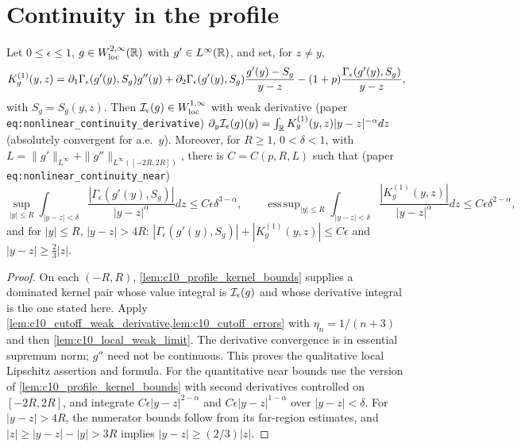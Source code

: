 \section{Continuity in the profile}

\begin{lemma}
  \label{lem:c10_Ieps_local}
  Let $0\le\epsilon\le1$, $g\in W^{2,\infty}_{\mathrm{loc}}(\mathbb{R})$ with $g'\in L^\infty(\mathbb{R})$, and set, for $z\ne y$,
  \[
    K^{(1)}_g(y,z)=\partial_1\Gamma_\epsilon(g'(y),S_g)g''(y)+\partial_2\Gamma_\epsilon(g'(y),S_g)\frac{g'(y)-S_g}{y-z}-(1+p)\frac{\Gamma_\epsilon(g'(y),S_g)}{y-z},
  \]
  with $S_g=S_g(y,z)$. Then $\mathcal{I}_\epsilon(g)\in W^{1,\infty}_{\mathrm{loc}}$ with weak derivative
  (paper \texttt{eq:nonlinear\_continuity\_derivative})
  $\partial_y\mathcal{I}_\epsilon(g)(y)=\int_{\mathbb{R}} K^{(1)}_g(y,z)|y-z|^{-\alpha}dz$ (absolutely convergent for a.e.\ $y$).
  Moreover, for $R\ge1$, $0<\delta<1$, with $L=\|g'\|_{L^\infty}+\|g''\|_{L^\infty([-2R,2R])}$, there is
  $C=C(p,R,L)$ such that (paper \texttt{eq:nonlinear\_continuity\_near})
  \[
    \sup_{|y|\le R}\int_{|y-z|<\delta}\frac{|\Gamma_\epsilon(g'(y),S_g)|}{|y-z|^\alpha}dz\le C\epsilon\delta^{3-\alpha},\qquad
    \mathop{\mathrm{ess\,sup}}_{|y|\le R}\int_{|y-z|<\delta}\frac{|K^{(1)}_g(y,z)|}{|y-z|^\alpha}dz\le C\epsilon\delta^{2-\alpha},
  \]
  and for $|y|\le R$, $|y-z|>4R$: $|\Gamma_\epsilon(g'(y),S_g)|+|K^{(1)}_g(y,z)|\le C\epsilon$ and
  $|y-z|\ge\frac23|z|$.
\end{lemma}
\begin{proof}
  On each $(-R,R)$, \cref{lem:c10_profile_kernel_bounds} supplies a dominated kernel pair whose
  value integral is $\mathcal{I}_\epsilon(g)$ and whose derivative integral is the one stated here.
  Apply \cref{lem:c10_cutoff_weak_derivative,lem:c10_cutoff_errors} with $\eta_n=1/(n+3)$ and then
  \cref{lem:c10_local_weak_limit}. The derivative convergence is in essential supremum norm;
  $g''$ need not be continuous. This proves the qualitative local Lipschitz assertion and formula.
  For the quantitative near bounds use the version of \cref{lem:c10_profile_kernel_bounds}
  with second derivatives controlled on $[-2R,2R]$, and integrate
  $C\epsilon|y-z|^{2-\alpha}$ and $C\epsilon|y-z|^{1-\alpha}$ over $|y-z|<\delta$.
  For $|y-z|>4R$, the numerator bounds follow from its far-region estimates, and
  $|z|\ge|y-z|-|y|>3R$ implies $|y-z|\ge(2/3)|z|$.
\end{proof}

